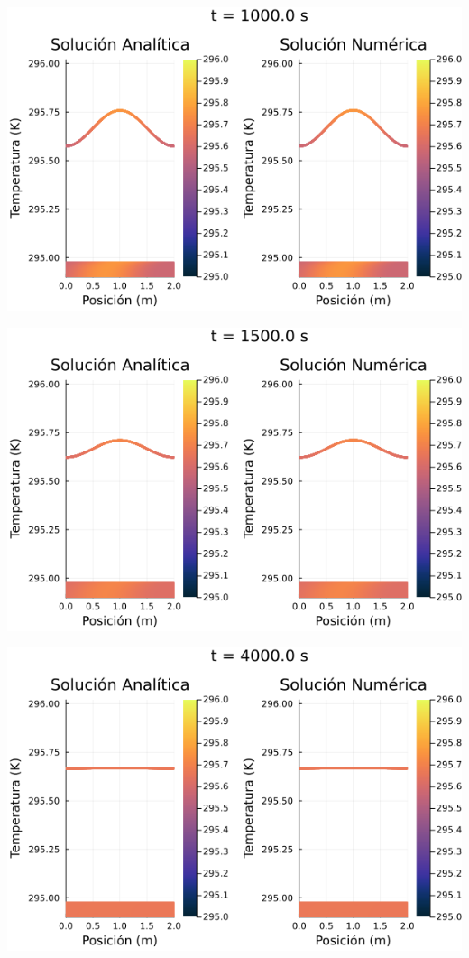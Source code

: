\documentclass[12pt]{article}
\begin{document}
\begin{center}
    \includegraphics[width=1\linewidth]{Ejemplo_02_t_3.png}
\end{center}

\begin{center}
    \includegraphics[width=1\linewidth]{Ejemplo_02_t_4.png}
\end{center}

\begin{center}
    \includegraphics[width=1\linewidth]{Ejemplo_02_t_6.png}
\end{center}
\end{document}
